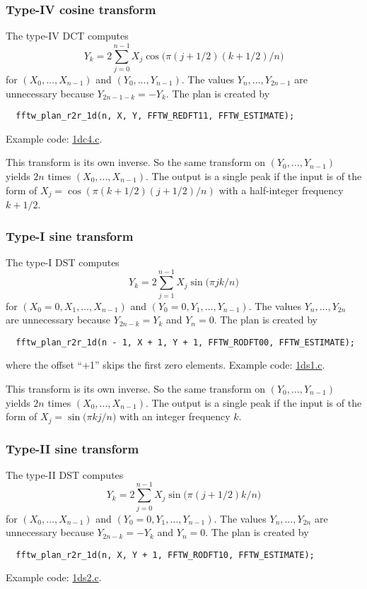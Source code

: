 \documentclass[12pt]{article}
\begin{document}
\subsubsection{Type-IV cosine transform}
The type-IV DCT computes
\begin{equation}
  Y_k = 2 \sum_{j = 0}^{n - 1} X_j \cos\big( \pi (j + 1/2) (k + 1/2) / n \big)
\end{equation}
%
for $(X_0, \dots, X_{n-1})$ and $(Y_0, \dots, Y_{n-1})$.
%
The values $Y_{n}, \dots, Y_{2n - 1}$ are unnecessary because
$Y_{2n - 1 - k} = -Y_k$.
%
The plan is created by
\begin{verbatim}
  fftw_plan_r2r_1d(n, X, Y, FFTW_REDFT11, FFTW_ESTIMATE);
\end{verbatim}
Example code: \url{1dc4.c}.


This transform is its own inverse.
%
So the same transform on $(Y_0, \dots, Y_{n-1})$
  yields $2n$ times $(X_0, \dots, X_{n-1})$.
The output is a single peak if the input is of the form of
  $X_j = \cos(\pi (k + 1/2) (j + 1/2) / n)$
  with a half-integer frequency $k + 1/2$.





\subsubsection{Type-I sine transform}
The type-I DST computes
\begin{equation}
  Y_k = 2 \sum_{j = 1}^{n - 1} X_j \sin\big( \pi j k / n \big)
\end{equation}
%
for $(X_0 = 0, X_1, \dots, X_{n-1})$ and $(Y_0 = 0, Y_1, \dots, Y_{n-1})$.
%
The values $Y_{n}, \dots, Y_{2n}$ are unnecessary because
$Y_{2n - k} = Y_k$ and $Y_n = 0$.
%
The plan is created by
\begin{verbatim}
  fftw_plan_r2r_1d(n - 1, X + 1, Y + 1, FFTW_RODFT00, FFTW_ESTIMATE);
\end{verbatim}
where the offset ``+1'' skips the first zero elements.
Example code: \url{1ds1.c}.


This transform is its own inverse.
%
So the same transform on $(Y_0, \dots, Y_{n-1})$
  yields $2n$ times $(X_0, \dots, X_{n-1})$.
The output is a single peak if the input is of the form of
  $X_j = \sin\big(\pi k j / n \big)$
  with an integer frequency $k$.





\subsubsection{Type-II sine transform}
The type-II DST computes
\begin{equation}
  Y_k = 2 \sum_{j = 0}^{n - 1} X_j \sin\big( \pi (j + 1/2) k / n \big)
\end{equation}
%
for $(X_0, \dots, X_{n-1})$ and $(Y_0 = 0, Y_1, \dots, Y_{n-1})$.
%
The values $Y_{n}, \dots, Y_{2n}$ are unnecessary because
$Y_{2n - k} = -Y_k$ and $Y_n = 0$.
%
The plan is created by
\begin{verbatim}
  fftw_plan_r2r_1d(n, X, Y + 1, FFTW_RODFT10, FFTW_ESTIMATE);
\end{verbatim}
Example code: \url{1ds2.c}.
\end{document}
